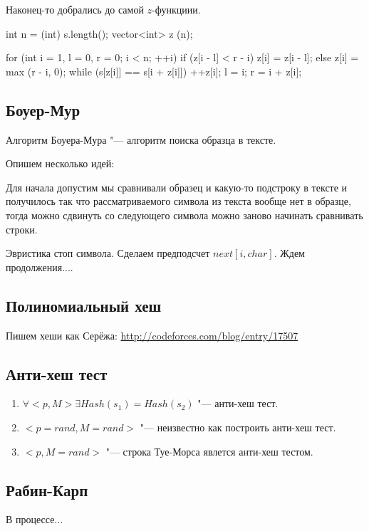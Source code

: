 Наконец-то добрались до самой $z$-функциии.

\begin{cppcode}
int n = (int) s.length();
vector<int> z (n);

for (int i = 1, l = 0, r = 0; i < n; ++i) {
  if (z[i - l] < r - i) {
    z[i] = z[i - l];
  } else {
    z[i] = max (r - i, 0);
    while (s[z[i]] == s[i + z[i]])
      ++z[i];
    l = i; 
    r = i + z[i];
  }
}
\end{cppcode} 


\subsection{Боуер-Мур}
Алгоритм Боуера-Мура "--- алгоритм поиска образца в тексте. 

Опишем несколько идей:

Для начала допустим мы сравнивали образец и какую-то подстроку в тексте и получилось так что рассматриваемого символа из текста вообще нет в образце, тогда можно сдвинуть со следующего символа можно заново начинать сравнивать строки. 

Эвристика стоп символа.
Сделаем предподсчет $next[i, char]$.
Ждем продолжения....

\subsection{Полиномиальный хеш}
Пишем хеши как Серёжа:
\url{http://codeforces.com/blog/entry/17507}

\subsection{Анти-хеш тест}

\begin{enumerate}
\item $\forall <p, M> \exists Hash(s_1) = Hash(s_2)$ "--- анти-хеш тест.
\item $<p = rand, M = rand>$ "--- неизвестно как построить анти-хеш тест.
\item $<p, M = rand>$ "--- строка Туе-Морса явлется анти-хеш тестом.
\end{enumerate}

\subsection{Рабин-Карп}
В процессе...